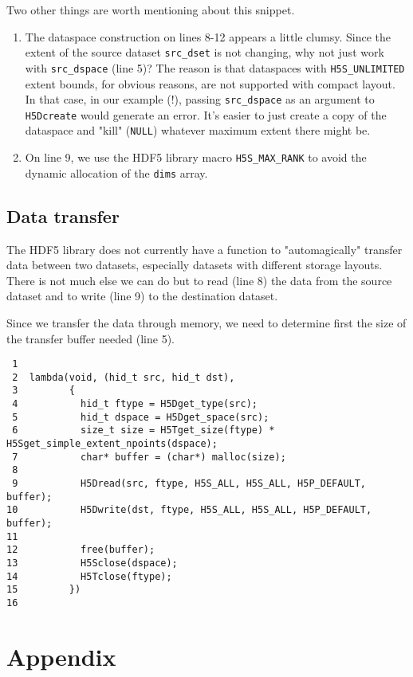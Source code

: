 \documentclass[a4paper, 12pt]{article}
\begin{document}
Two other things are worth mentioning about this snippet.

\begin{enumerate}
\item The dataspace construction on lines 8-12 appears a little
clumsy. Since the extent of the source dataset \texttt{src\_dset} is not changing,
why not just work with \texttt{src\_dspace} (line 5)? The reason is that
dataspaces with \texttt{H5S\_UNLIMITED} extent bounds, for obvious reasons, are not
supported with compact layout. In that case, in our example (!), passing
\texttt{src\_dspace} as an argument to \texttt{H5Dcreate} would generate an error. It's
easier to just create a copy of the dataspace and "kill" (\texttt{NULL}) whatever
maximum extent there might be.
\item On line 9, we use the HDF5 library macro \texttt{H5S\_MAX\_RANK} to
avoid the dynamic allocation of the \texttt{dims} array.
\end{enumerate}

\subsection{Data transfer \label{org0f753cb}}
\label{sec:org7a353e8}

The HDF5 library does not currently have a function to "automagically" transfer
data between two datasets, especially datasets with different storage
layouts. There is not much else we can do but to read (line 8) the
data from the source dataset and to write (line 9) to the
destination dataset.

Since we transfer the data through memory, we need to determine first the size
of the transfer buffer needed (line 5).

\begin{verbatim}
 1
 2  lambda(void, (hid_t src, hid_t dst),
 3         {
 4           hid_t ftype = H5Dget_type(src);
 5           hid_t dspace = H5Dget_space(src);
 6           size_t size = H5Tget_size(ftype) * H5Sget_simple_extent_npoints(dspace);
 7           char* buffer = (char*) malloc(size);
 8
 9           H5Dread(src, ftype, H5S_ALL, H5S_ALL, H5P_DEFAULT, buffer);
10           H5Dwrite(dst, ftype, H5S_ALL, H5S_ALL, H5P_DEFAULT, buffer);
11
12           free(buffer);
13           H5Sclose(dspace);
14           H5Tclose(ftype);
15         })
16
\end{verbatim}

\section{Appendix}
\label{sec:org2b4893a}
\end{document}
